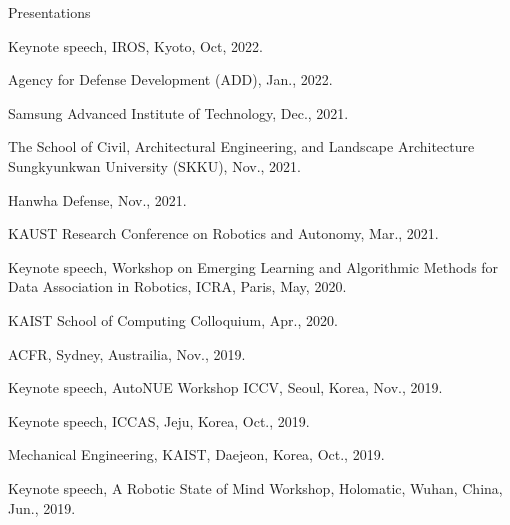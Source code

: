 \begin{rSection}{Presentations}

\begin{pubSubsectionNum}{}
  \item Keynote speech, IROS, Kyoto, Oct, 2022.

  \item Agency for Defense Development (ADD), Jan., 2022.

  \item Samsung Advanced Institute of Technology, Dec., 2021.

  \item The School of Civil, Architectural Engineering, and Landscape Architecture
Sungkyunkwan University (SKKU), Nov., 2021.

  \item Hanwha Defense, Nov., 2021.



  \item KAUST Research Conference on Robotics and Autonomy, Mar., 2021.


  \item Keynote speech, Workshop on Emerging Learning and Algorithmic Methods for Data Association in Robotics, ICRA, Paris, May, 2020.

  \item KAIST School of Computing Colloquium, Apr., 2020.


  \item \ac{ACFR}, Sydney, Austrailia, Nov., 2019.

  \item Keynote speech, AutoNUE Workshop \ac{ICCV}, Seoul, Korea,  Nov., 2019.

  \item Keynote speech, \ac{ICCAS}, Jeju, Korea, Oct., 2019.

  \item Mechanical Engineering, \ac{KAIST}, Daejeon, Korea, Oct., 2019.

  \item Keynote speech, A Robotic State of Mind Workshop, Holomatic, Wuhan, China, Jun., 2019.


\end{pubSubsectionNum}
\end{rSection}
